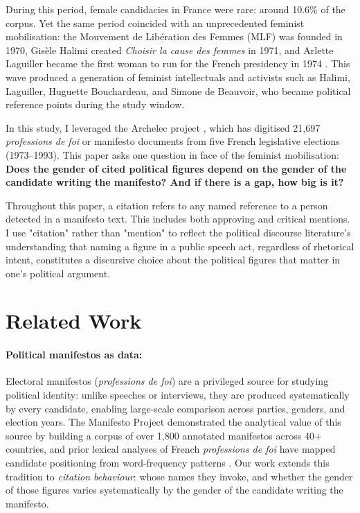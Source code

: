 \documentclass{article}
\begin{document}
During this period, female candidacies in France were rare: around 10.6\% of the corpus. Yet the same period coincided with an unprecedented feminist mobilisation: the Mouvement de Libération des Femmes (MLF) was founded in 1970, Gisèle Halimi created \emph{Choisir la cause des femmes} in 1971, and Arlette Laguiller became the first woman to run for the French presidency in 1974 \cite{duchen1986, picq1993}. This wave produced a generation of feminist intellectuals and activists such as Halimi, Laguiller, Huguette Bouchardeau, and Simone de Beauvoir, who became political reference points during the study window.

In this study, I leveraged the Archelec project \cite{gaultier2022}, which has digitised 21,697 \emph{professions de foi} or manifesto documents from five French legislative elections (1973--1993). This paper asks one question in face of the feminist mobilisation: \textbf{Does the gender of cited political figures depend on the gender of the candidate writing the manifesto? And if there is a gap, how big is it?}

Throughout this paper, a citation refers to any named reference to a person detected in a manifesto text. This includes both approving and critical mentions. I use "citation" rather than "mention" to reflect the political discourse literature's understanding that naming a figure in a public speech act, regardless of rhetorical intent, constitutes a discursive choice about the political figures that matter in one's political argument.

\section{Related Work}

\paragraph{Political manifestos as data:}
Electoral manifestos (\emph{professions de foi}) are a privileged source for studying political identity: unlike speeches or interviews, they are produced systematically by every candidate, enabling large-scale comparison across parties, genders, and election years. The Manifesto Project \cite{merz2016manifesto} demonstrated the analytical value of this source by building a corpus of over 1,800 annotated manifestos across 40+ countries, and prior lexical analyses of French \emph{professions de foi} have mapped candidate positioning from word-frequency patterns \cite{mots2002}. Our work extends this tradition to \emph{citation behaviour}: whose names they invoke, and whether the gender of those figures varies systematically by the gender of the candidate writing the manifesto.
\end{document}
